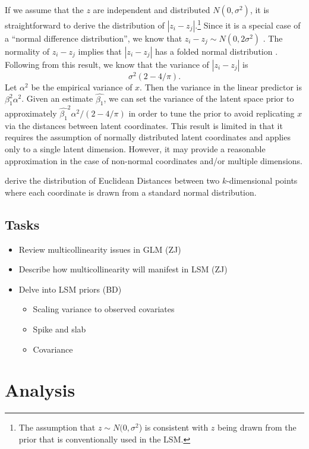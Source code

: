 \documentclass[12pt]{article}
\begin{document}
If we assume that the $z$ are independent and distributed $N(0,\sigma^2)$, it is straightforward to derive the distribution of $ |z_i - z_j|$.\footnote{The assumption that $z \sim N(0,\sigma^2$) is consistent with $z$ being drawn from the prior that is conventionally used in the LSM.} Since it is a special case of a ``normal difference distribution'', we know that $z_i - z_j \sim N(0,2\sigma^2)$ \citep{devore2012}. The normality of $z_i - z_j$ implies that $|z_i - z_j|$ has a folded normal distribution \citep{leone1961}. Following from this result, we know that the variance of  $|z_i - z_j|$ is $$\sigma^2(2-4/\pi). $$ Let $\alpha^2$ be the empirical variance of $x$. Then the variance in the linear predictor is $\beta_1^2\alpha^2$. Given an estimate $\hat{\beta_1}$, we can set the variance of the latent space prior to approximately $\hat{\beta_1}^2\alpha^2/(2-4/\pi)$ in order to tune the prior to avoid replicating $x$ via the distances between latent coordinates. This result is limited in that it requires the assumption of normally distributed latent coordinates and applies only to a single latent dimension. However, it may provide a reasonable approximation in the case of non-normal coordinates and/or multiple dimensions. 

\cite{thirey2015} derive the distribution of Euclidean Distances between two $k$-dimensional points where each coordinate is drawn from a standard normal distribution.

\subsection{Tasks}
\begin{itemize}
\item Review multicollinearity issues in GLM (ZJ)
\item Describe how multicollinearity will manifest in LSM (ZJ)
\item Delve into LSM priors (BD)
\begin{itemize}
\item Scaling variance to observed covariates
\item Spike and slab
\item Covariance
\end{itemize}
\end{itemize}

\section{Analysis}
\end{document}
